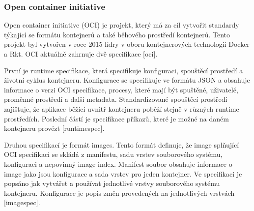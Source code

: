 \subsubsection{Open container initiative}
Open container initiative (OCI) je projekt, který má za cíl vytvořit standardy týkající se formátu kontejnerů a také běhového prostředí kontejnerů. Tento projekt byl vytvořen v roce 2015 lídry v oboru kontejnerových technologií Docker a Rkt. OCI aktuálně zahrnuje dvě specifikace [oci]. \par
První je runtime specifikace, která specifikuje konfiguraci, spouštěcí prostředí a životní cyklus kontejneru. Konfigurace se specifikuje ve formátu JSON a obsahuje informace o verzi OCI specifikace, procesy, které mají být spuštěné, uživatelé, proměnné prostředí a další metadata. Standardizované spouštěcí prostředí zajištuje, že aplikace běžící uvnitř kontejneru poběží stejně v různých runtime prostředích. Poslední částí je specifikace příkazů, které je možné na daném kontejneru provézt [runtimespec].\par
Druhou specifikací je formát images. Tento formát definuje, že image splňující OCI specifikaci se skládá z manifestu, sadu vrstev souborového systému, konfiguraci a nepovinný image index. Manifest soubor obsahuje informace o image jako jsou konfigurace a sada vrstev pro jeden kontejner. Ve specifikaci je popsáno jak vytvářet a používat jednotlivé vrstvy souborového systému kontejneru. Konfigurace je popis změn provedených na jednotlivých vrstvách [imagespec]. 

